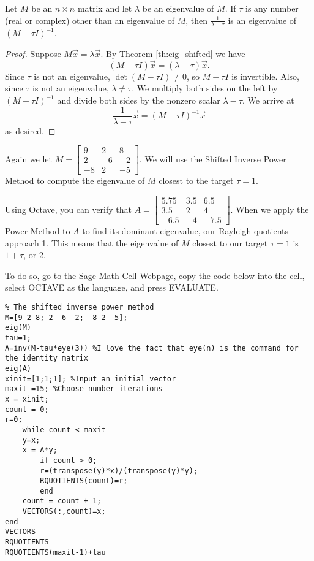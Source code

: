 \documentclass{ximera}
\begin{document}
\begin{theorem}\label{th:eig_shifted_inverse}
Let $M$ be an $n \times n$ matrix and let $\lambda$ be an eigenvalue of $M$.  If $\tau$ is any number (real or complex) other than an eigenvalue of $M$, then $\frac{1}{\lambda - \tau}$ is an eigenvalue of $(M - \tau I)^{-1}$.
\end{theorem}

\begin{proof}
Suppose $M\vec{x}=\lambda\vec{x}$.  By Theorem \ref{th:eig_shifted} we have 
$$(M - \tau I)\vec{x}=(\lambda-\tau)\vec{x}.$$  
Since $\tau$ is not an eigenvalue, $\det (M - \tau I) \ne 0$, so $M - \tau I$ is invertible.  Also, since $\tau$ is not an eigenvalue, $\lambda \ne \tau$.  We multiply both sides on the left by $(M - \tau I)^{-1}$ and divide both sides by the nonzero scalar $\lambda - \tau$.  We arrive at 
$$\frac{1}{\lambda - \tau}\vec{x} = (M - \tau I)^{-1}\vec{x}$$
as desired.
\end{proof}

Again we let $M=\left[ \begin{array}{rrr}
9 & 2 & 8 \\
2 & -6 & -2 \\
-8 & 2 & -5
\end{array}\right]$.  We will use the Shifted Inverse Power Method to compute the eigenvalue of $M$ closest to the target $\tau = 1$. 

Using Octave, you can verify that $A=\left[ \begin{array}{rrr}
5.75 & 3.5 & 6.5 \\
3.5 & 2 & 4 \\
-6.5 & -4 & -7.5
\end{array}\right]$.  When we apply the Power Method to $A$ to find its dominant eigenvalue, our Rayleigh quotients approach 1.  This means that the eigenvalue of $M$ closest to our target $\tau = 1$ is $1+\tau$, or 2.

To do so, go to the \href{https://sagecell.sagemath.org/}{Sage Math Cell Webpage}, copy the code below into the cell, select OCTAVE as the language, and press EVALUATE.

\begin{verbatim}
% The shifted inverse power method
M=[9 2 8; 2 -6 -2; -8 2 -5];
eig(M)
tau=1;
A=inv(M-tau*eye(3)) %I love the fact that eye(n) is the command for the identity matrix
eig(A)
xinit=[1;1;1]; %Input an initial vector
maxit =15; %Choose number iterations
x = xinit;
count = 0;
r=0;
    while count < maxit
    y=x;
    x = A*y;
        if count > 0; 
        r=(transpose(y)*x)/(transpose(y)*y);
        RQUOTIENTS(count)=r;
        end
    count = count + 1;
    VECTORS(:,count)=x;
end
VECTORS
RQUOTIENTS
RQUOTIENTS(maxit-1)+tau
\end{verbatim}
\end{document}
